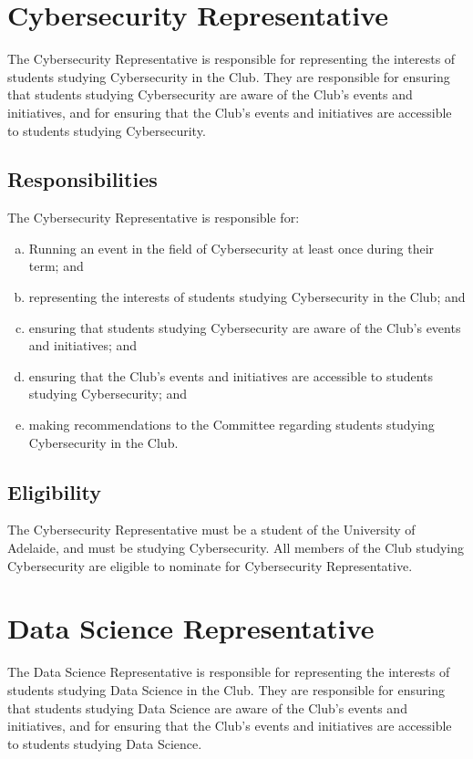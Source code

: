 \documentclass[11pt]{report}
\begin{document}
\section{Cybersecurity Representative}
The Cybersecurity Representative is responsible for representing the interests of students studying Cybersecurity in the Club. They are responsible for ensuring that students studying Cybersecurity are aware of the Club's events and initiatives, and for ensuring that the Club's events and initiatives are accessible to students studying Cybersecurity.
\subsection{Responsibilities}
The Cybersecurity Representative is responsible for:
\begin{enumerate}[(a)]
    \item Running an event in the field of Cybersecurity at least once during their term; and
    \item representing the interests of students studying Cybersecurity in the Club; and
    \item ensuring that students studying Cybersecurity are aware of the Club's events and initiatives; and
    \item ensuring that the Club's events and initiatives are accessible to students studying Cybersecurity; and
    \item making recommendations to the Committee regarding students studying Cybersecurity in the Club.
\end{enumerate}
\subsection{Eligibility}
The Cybersecurity Representative must be a student of the University of Adelaide, and must be studying Cybersecurity. All members of the Club studying Cybersecurity are eligible to nominate for Cybersecurity Representative.

\section{Data Science Representative}
The Data Science Representative is responsible for representing the interests of students studying Data Science in the Club. They are responsible for ensuring that students studying Data Science are aware of the Club's events and initiatives, and for ensuring that the Club's events and initiatives are accessible to students studying Data Science.
\end{document}

